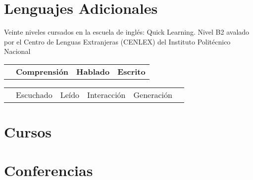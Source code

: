 \documentclass[11pt,a4paper]{moderncv}
\begin{document}
\vspace{-3mm}

\section{Lenguajes Adicionales}
Veinte niveles cursados en la escuela de inglés: Quick Learning. Nivel B2 avalado por el Centro de Lenguas Extranjeras (CENLEX) del Instituto Politécnico Nacional 

\begin{tabular}{p{67mm} p{40mm} p{45mm} p{20mm}}
& \textbf{Comprensión} & \textbf{Hablado} & \textbf{Escrito} \\
\end{tabular}

\begin{tabular}{p{67mm} p{27mm} p{13mm} p{20mm} p{20mm} p{20mm}}
& Escuchado &  Leído & Interacción & Generación & \\
\end{tabular}

\vspace{3mm}

\section{Cursos}
\vspace{-1mm}


\section{Conferencias}
\end{document}
